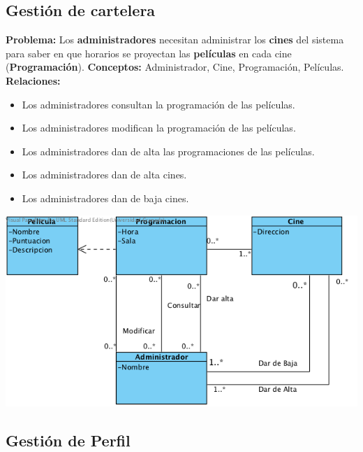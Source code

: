 \documentclass{article}
\begin{document}
	
	\subsection*{Gestión de cartelera}
	\textbf{Problema:} Los \textbf{administradores} necesitan administrar los \textbf{cines} del sistema para saber en que horarios se proyectan 
	las \textbf{películas} en cada cine (\textbf{Programación}).
	\textbf{Conceptos:} Administrador, Cine, Programación, Películas.\\
	\textbf{	Relaciones:}
		\begin{itemize}
			\item Los administradores consultan la programación de las películas.
			\item Los administradores modifican la programación de las películas.
			\item Los administradores dan de alta las programaciones de las películas.
			\item Los administradores dan de alta cines.
			\item Los administradores dan de baja cines.
		\end{itemize}
	\includegraphics[width=0.7\linewidth]{./C-Cartelera}
	
	
	\subsection*{Gestión de Perfil}



\end{document}
